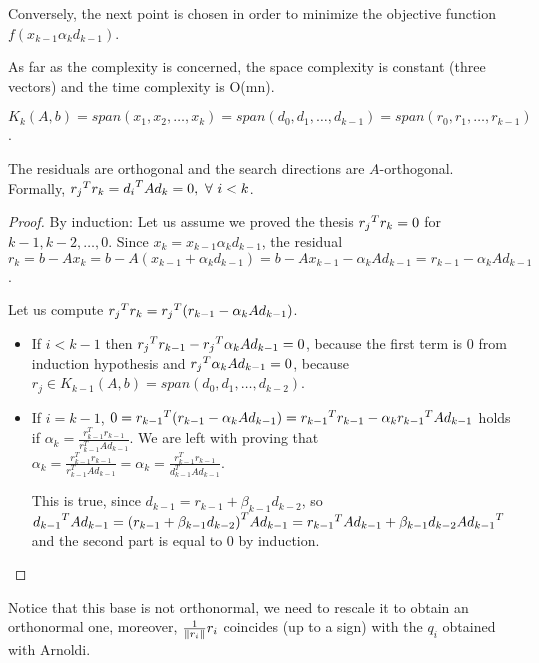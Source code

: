 \documentclass[ComputationalMathematics.tex]{subfiles}
\begin{document}
Conversely, the next point is chosen in order to minimize the objective function $f(x_{k-1} \alpha_k d_{k-1})$.

As far as the complexity is concerned, the space complexity is constant (three vectors) and the time complexity is O(mn).

\begin{theorem}
  $K_k(A, b) = span(x_1, x_2, \ldots, x_k) = span(d_0, d_1, \ldots, d_{k-1}) = span(r_0, r_1, \ldots, r_{k-1})$.
\end{theorem}

\begin{theorem}
The residuals are orthogonal and the search directions are $A$-orthogonal.
Formally,
  ${r_j}^{T} r_k = {d_i}^{T} A d_k = 0,~\forall~i<k$.
\end{theorem}

\begin{proof}
By induction:
  Let us assume we proved the thesis ${r_j}^{T} r_k = 0$ for $k-1, k-2, \ldots, 0$.
  Since $x_k = x_{k-1} \alpha_{k} d_{k-1}$, the residual $r_k = b-Ax_k = b - A(x_{k-1} + \alpha_{k} d_{k-1}) = b - A x_{k-1} - \alpha_k A d_{k-1} = r_{k-1} - \alpha_k A d_{k-1}$.

  Let us compute ${r_j}^{T} r_k = {r_j}^{T} (r_{k-1} - \alpha_k A d_{k-1})$.
  \begin{itemize}
    \item If $i < k-1$ then ${r_j}^{T} r_{k-1} - {r_j}^{T} \alpha_k A d_{k-1} = 0$, because the first term is $0$ from induction hypothesis and ${r_j}^{T} \alpha_k A d_{k-1} = 0$, because $r_j \in K_{k-1}(A, b) = span(d_0, d_1, \ldots, d_{k-2})$.
    \item If $i = k-1$, $0 = {r_{k-1}}^{T} (r_{k-1} - \alpha_k A d_{k-1}) = {r_{k-1}}^{T} r_{k-1} - \alpha_k {r_{k-1}}^{T} A d_{k-1}$ holds if $\alpha_k=\frac{r_{k-1}^T r_{k-1}}{r_{k-1}^T A d_{k-1}}$. 
      We are left with proving that $\alpha_k=\frac{r_{k-1}^T r_{k-1}}{r_{k-1}^T A d_{k-1}} = \alpha_k=\frac{r_{k-1}^T r_{k-1}}{d_{k-1}^T A d_{k-1}}$.

      This is true, since $d_{k-1} = r_{k-1} + \beta_{k-1} d_{k-2}$, so ${d_{k-1}}^{T} A d_{k-1} = {(r_{k-1} + \beta_{k-1} d_{k-2})}^{T} A d_{k-1} = {r_{k-1}}^{T} A d_{k-1} + \beta_{k-1} {d_{k-2}Ad_{k-1}}^{T}$ and the second part is equal to $0$ by induction. 
  \end{itemize}
\end{proof}

Notice that this base is not orthonormal, we need to rescale it to obtain an orthonormal one, moreover, $\frac{1}{\left\lVert r_i\right\rVert}r_i$ coincides (up to a sign) with the $q_i$ obtained with Arnoldi.
\end{document}
